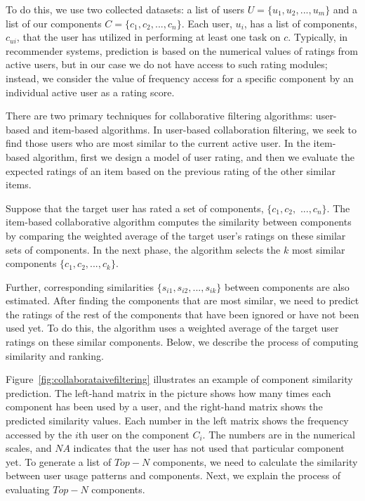 To do this, we use two collected datasets: 
a list of users $U=\{u_1, u_2, ..., u_m\}$ and 
a list of our components $C =\{c_1, c_2, ..., c_n\}$. 
Each user, $u_i$, has a list of components, $c_{ui}$, that the user
has utilized in performing at least one task on $c$. 
Typically, in recommender systems, prediction is based on the numerical values of 
ratings from active users, but in our case we do not have access to such rating 
modules; instead, we consider the value of frequency access for a specific component by 
an individual active user as a rating score.

There are two primary techniques for collaborative filtering algorithms:
user-based and item-based algorithms. 
In user-based collaboration filtering, we seek to find 
those users who are most similar to the current active user.
In the item-based algorithm, first we design a model of user rating, 
and then we evaluate the expected ratings of an item based on the previous 
rating of the other similar items.


Suppose that the target user has rated a set of components,
$\{c_1, c_2,$ 
$..., c_n\}$. The item-based collaborative algorithm
computes the similarity between components by comparing the weighted average
of the target user's ratings on these similar sets of components. 
In the next phase, the algorithm selects the $k$ most similar components 
$\{c_1, c_2, ..., c_k\}$.

Further, corresponding similarities $\{s_{i1}, s_{i2}, ..., s_{ik}\}$  
between components are also estimated. After finding the 
components that are most similar, we need to predict the ratings of the
rest of the components that have been ignored or have not been used yet.
To do this, the algorithm uses a weighted average of the target user ratings
on these similar components.
Below, we describe the process of computing similarity and ranking.

Figure~\ref{fig:collaborataivefiltering} illustrates an example of
component similarity prediction.
The left-hand matrix in the picture shows how many times each component has been used
by a user, and the right-hand matrix shows the predicted similarity values.
Each number in the left matrix shows the frequency accessed by the
$i$th user on the component $C_{i}$. The numbers are in the numerical scales, and
$NA$ indicates that the user has not used that particular component yet.
To generate a list of $Top-N$ components, we need to calculate the
similarity between user usage patterns and components.
Next, we explain the process of evaluating $Top-N$ components.

